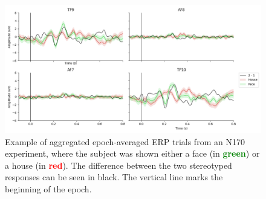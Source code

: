 \begin{figure}
    \centering
    \includegraphics[trim=0 0 80 0, clip, width=14cm]{img/n170_viz.png}
    \caption{Example of aggregated epoch-averaged ERP trials from an N170 experiment, where the subject was shown either a face (in \textcolor{green}{\textbf{green}}) or a house (in \textcolor{red}{\textbf{red}}). The difference between the two stereotyped responses can be seen in black. The vertical line marks the beginning of the epoch.}\label{figure:n170}
\end{figure}
